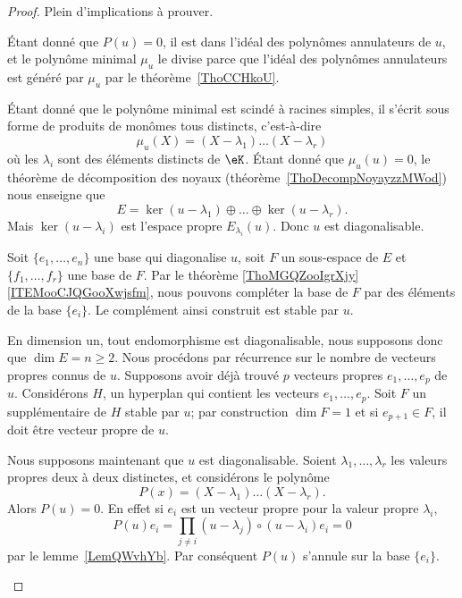 \begin{proof}
	Plein d'implications à prouver.
	\begin{subproof}
		 Étant donné que \( P(u)=0\), il est dans l'idéal des polynômes annulateurs de \( u\), et le polynôme minimal \( \mu_u\) le divise parce que l'idéal des polynômes annulateurs est généré par \( \mu_u\) par le théorème~\ref{ThoCCHkoU}.

		 Étant donné que le polynôme minimal est scindé à racines simples, il s'écrit sous forme de produits de monômes tous distincts, c'est-à-dire
		\begin{equation}
			\mu_u(X)=(X-\lambda_1)\ldots(X-\lambda_r)
		\end{equation}
		où les \( \lambda_i\) sont des éléments distincts de \( \eK\). Étant donné que \( \mu_u(u)=0\), le théorème de décomposition des noyaux (théorème~\ref{ThoDecompNoyayzzMWod}) nous enseigne que
		\begin{equation}
			E=\ker(u-\lambda_1)\oplus\ldots\oplus\ker(u-\lambda_r).
		\end{equation}
		Mais \( \ker(u-\lambda_i)\) est l'espace propre \( E_{\lambda_i}(u)\). Donc \( u\) est diagonalisable.

		 Soit \( \{ e_1,\ldots, e_n \}\) une base qui diagonalise \( u\), soit \( F\) un sous-espace de \( E\) et \( \{ f_1,\ldots, f_r \}\) une base de \( F\). Par le théorème \ref{ThoMGQZooIgrXjy}\ref{ITEMooCJQGooXwjsfm}, nous pouvons compléter la base de \( F\) par des éléments de la base \( \{ e_i \}\). Le complément ainsi construit est stable par \( u\).

		 En dimension un, tout endomorphisme est diagonalisable, nous supposons donc que \( \dim E=n\geq 2\). Nous procédons par récurrence sur le nombre de vecteurs propres connus de \( u\). Supposons avoir déjà trouvé \( p\) vecteurs propres \( e_1,\ldots, e_p\) de \( u\). Considérons \( H\), un hyperplan qui contient les vecteurs \( e_1,\ldots, e_p\). Soit \( F\) un supplémentaire de \( H\) stable par \( u\); par construction \( \dim F=1\) et si \( e_{p+1}\in F\), il doit être vecteur propre de \( u\).

		 Nous supposons maintenant que \( u\) est diagonalisable. Soient \( \lambda_1,\ldots, \lambda_r\) les valeurs propres deux à deux distinctes, et considérons le polynôme
		\begin{equation}
			P(x)=(X-\lambda_1)\ldots (X-\lambda_r).
		\end{equation}
		Alors \( P(u)=0\). En effet si \( e_i\) est un vecteur propre pour la valeur propre \( \lambda_i\),
		\begin{equation}
			P(u)e_i=\prod_{j\neq i}(u-\lambda_j)\circ(u-\lambda_i)e_i=0
		\end{equation}
		par le lemme~\ref{LemQWvhYb}. Par conséquent \( P(u)\) s'annule sur la base \( \{ e_i \}\).


\end{subproof}
\end{proof}
